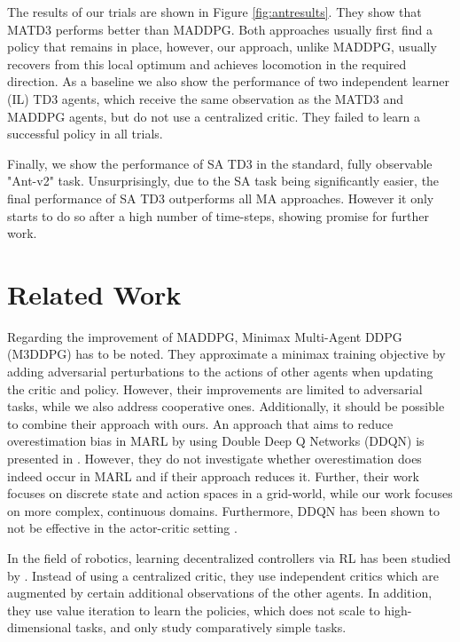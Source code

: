 \documentclass{article}
\begin{document}
The results of our trials are shown in Figure \ref{fig:antresults}. 
They show that \gls*{MATD3} performs better than \gls*{MADDPG}.
Both approaches usually first find a policy that remains in place, however, our approach, unlike \gls*{MADDPG}, usually recovers from this local optimum and achieves locomotion in the required direction.
As a baseline we also show the performance of two independent learner (IL) \gls*{TD3} agents, which receive the same observation as the \gls*{MATD3} and \gls*{MADDPG} agents, but do not use a centralized critic.
They failed to learn a successful policy in all trials.

Finally, we show the performance of SA TD3 in the standard, fully observable "Ant-v2" task.
Unsurprisingly, due to the SA task being significantly easier, the final performance of SA TD3 outperforms all MA approaches.
However it only starts to do so after a high number of time-steps, showing promise for further work.

\vspace{-1.5mm}
\section{Related Work}
\vspace{-1.5mm}
Regarding the improvement of \gls*{MADDPG}, Minimax Multi-Agent DDPG (M3DDPG) \cite{Li2019} has to be noted.
They approximate a minimax training objective by adding adversarial perturbations to the actions of other agents when updating the critic and policy.
However, their improvements are limited to adversarial tasks, while we also address cooperative ones.
Additionally, it should be possible to combine their approach with ours.
An approach that aims to reduce overestimation bias in \gls*{MARL} by using Double Deep Q Networks (DDQN) is presented in \cite{Simoes2017}. 
However, they do not investigate whether overestimation does indeed occur in \gls*{MARL} and if their approach reduces it.
Further, their work focuses on discrete state and action spaces in a grid-world, while our work focuses on more complex, continuous domains.
Furthermore, DDQN has been shown to not be effective in the actor-critic setting \cite{Fujimoto2018}.

In the field of robotics, learning decentralized controllers via \gls*{RL} has been studied by \cite{Busoniu2006}. 
Instead of using a centralized critic, they use independent critics which are augmented by certain additional observations of the other agents. 
In addition, they use value iteration to learn the policies, which does not scale to high-dimensional tasks, and only study comparatively simple tasks.
\vspace{-1.5mm}
\glsresetall
\end{document}
